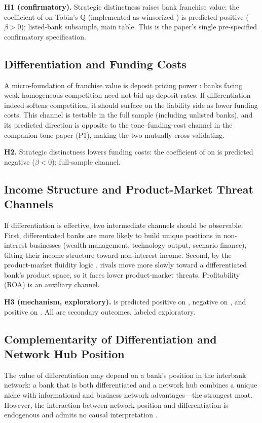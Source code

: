 \textbf{H1 (confirmatory).} Strategic distinctness raises bank
franchise value: the coefficient of  on
Tobin's Q (implemented as winsorized ) is predicted
positive ($\beta>0$); listed-bank subsample, main table. This is the
paper's single pre-specified confirmatory specification.

\subsection{Differentiation and Funding Costs}
A micro-foundation of franchise value is deposit pricing power
\parencite{drechsler2026franchise}: banks facing weak homogeneous
competition need not bid up deposit rates. If differentiation indeed
softens competition, it should surface on the liability side as lower
funding costs. This channel is testable in the full sample (including
unlisted banks), and its predicted direction is opposite to the
tone--funding-cost channel in the companion tone paper (P1), making
the two mutually cross-validating.

\textbf{H2.} Strategic distinctness lowers funding costs: the
coefficient of  on  is
predicted negative ($\beta<0$); full-sample channel.

\subsection{Income Structure and Product-Market Threat Channels}
If differentiation is effective, two intermediate channels should be
observable. First, differentiated banks are more likely to build
unique positions in non-interest businesses (wealth management,
technology output, scenario finance), tilting their income structure
toward non-interest income. Second, by the product-market fluidity
logic \parencite{hoberg2014fluidity}, rivals move more slowly toward
a differentiated bank's product space, so it faces lower
product-market threats. Profitability (ROA) is an auxiliary channel.

\textbf{H3 (mechanism, exploratory).}  is
predicted positive on , negative on
, and positive on . All are secondary
outcomes, labeled exploratory.

\subsection{Complementarity of Differentiation and Network Hub Position}
The value of differentiation may depend on a bank's position in the
interbank network: a bank that is both differentiated and a network
hub combines a unique niche with informational and business network
advantages---the strongest moat. However, the interaction between
network position and differentiation is endogenous and admits no
causal interpretation \parencite{brambor2006understanding}.

